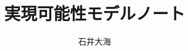 \newcommand{\HK}{\mathord{\mathbf{HK}}}
\newcommand{\CL}{\mathord{\mathbf{CL}}}
\newcommand{\HJ}{\mathord{\mathbf{HJ}}}

\newcommand{\B}{\comb{B}}
\renewcommand{\S}{\comb{S}}
\renewcommand{\C}{\comb{C}}
\renewcommand{\I}{\comb{I}}
\newcommand{\K}{\comb{K}}
\newcommand{\Y}{\comb{Y}}
\newcommand{\W}{\comb{W}}
\newcommand{\BCKW}{\comb{BCKW}}
\newcommand{\BCKWI}{\comb{BCKWI}}
\newcommand{\cc}{\comb{c\hspace{-1pt}c}}
\newcommand{\subst}[1]{\left[\begin{smallmatrix}#1\end{smallmatrix}\right]}
\newcommand{\num}[1]{\underline{#1}}

\makeatletter
\def\KVM#1{\KVM@init#1{\relax}}
\def\KVM@init#1#2{#1 \cons \KVM@rest#2}
\def\KVM@rest#1#2{%
\def\KVM@next{\KVM@rest{#1 \push #2}}
\ifx#2\relax
#1
\else
\expandafter\KVM@next
\fi
}
\makeatother

\title{実現可能性モデルノート}
\author{石井大海}

\usepackage{amssymb}	%
\usepackage{amsmath}	%
\usepackage[normalem]{ulem}	%

